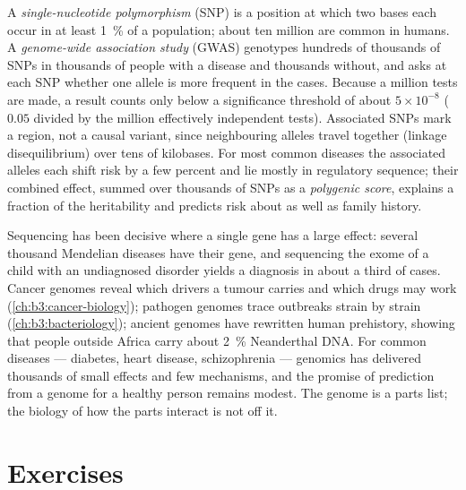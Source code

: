 \begin{definition}\label{def:b3:genomics:gwas}
A \emph{single-nucleotide polymorphism} (SNP) is a position at which
two bases each occur in at least \qty{1}{\%} of a population; about
ten million are common in humans. A \emph{genome-wide association
study} (GWAS) genotypes hundreds of thousands of SNPs in thousands of
people with a disease and thousands without, and asks at each SNP
whether one allele is more frequent in the cases. Because a million
tests are made, a result counts only below a significance threshold of
about $5\times 10^{-8}$ ($0.05$ divided by the million effectively
independent tests). Associated SNPs mark a region, not a causal
variant, since neighbouring alleles travel together (linkage
disequilibrium) over tens of kilobases. For most common diseases the
associated alleles each shift risk by a few percent and lie mostly in
regulatory sequence; their combined effect, summed over thousands of
SNPs as a \emph{polygenic score}, explains a fraction of the
heritability and predicts risk about as well as family history.
\end{definition}

\begin{remark}\label{rem:b3:genomics:delivered}
Sequencing has been decisive where a single gene has a large effect:
several thousand Mendelian diseases have their gene, and sequencing the
exome of a child with an undiagnosed disorder yields a diagnosis in
about a third of cases. Cancer genomes reveal which drivers a tumour
carries and which drugs may work (\cref{ch:b3:cancer-biology});
pathogen genomes trace outbreaks strain by strain
(\cref{ch:b3:bacteriology}); ancient genomes have rewritten human
prehistory, showing that people outside Africa carry about \qty{2}{\%}
Neanderthal DNA. For common diseases --- diabetes, heart disease,
schizophrenia --- genomics has delivered thousands of small effects and
few mechanisms, and the promise of prediction from a genome for a
healthy person remains modest. The genome is a parts list; the
biology of how the parts interact is not  off it.
\end{remark}

\section{Exercises}

